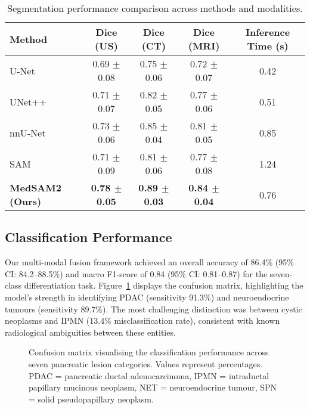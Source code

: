 \documentclass[a4paper, fleqn]{cas-dc}
\begin{document}
    \begin{table}[htbp]
        \centering
        \caption{Segmentation performance comparison across methods and
        modalities.}
        \label{tab:segmentation}
        \begin{tabular*}{\tblwidth}{@{} lcccc @{}}
            \toprule \textbf{Method} & \textbf{Dice (US)}       & \textbf{Dice (CT)}       & \textbf{Dice (MRI)}      & \textbf{Inference Time (s)} \\
            \midrule U‑Net           & 0.69 $\pm$ 0.08          & 0.75 $\pm$ 0.06          & 0.72 $\pm$ 0.07          & 0.42                        \\
            UNet++                   & 0.71 $\pm$ 0.07          & 0.82 $\pm$ 0.05          & 0.77 $\pm$ 0.06          & 0.51                        \\
            nnU‑Net                  & 0.73 $\pm$ 0.06          & 0.85 $\pm$ 0.04          & 0.81 $\pm$ 0.05          & 0.85                        \\
            SAM                      & 0.71 $\pm$ 0.09          & 0.81 $\pm$ 0.06          & 0.77 $\pm$ 0.08          & 1.24                        \\
            \textbf{MedSAM2 (Ours)}  & \textbf{0.78 $\pm$ 0.05} & \textbf{0.89 $\pm$ 0.03} & \textbf{0.84 $\pm$ 0.04} & 0.76                        \\
            \bottomrule
        \end{tabular*}
    \end{table}

    \subsection{Classification Performance}
    Our multi‐modal fusion framework achieved an overall accuracy of 86.4\% (95\%
    CI: 84.2–88.5\%) and macro F1‑score of 0.84 (95\% CI: 0.81–0.87) for the
    seven‐class differentiation task. Figure~\ref{fig:confusion} displays the confusion
    matrix, highlighting the model's strength in identifying PDAC (sensitivity 91.3\%)
    and neuroendocrine tumours (sensitivity 89.7\%). The most challenging distinction
    was between cystic neoplasms and IPMN (13.4\% misclassification rate), consistent
    with known radiological ambiguities between these entities.

    \begin{figure}[htbp]
        \centering
        \caption{Confusion matrix visualising the classification performance
        across seven pancreatic lesion categories. Values represent percentages.
        PDAC = pancreatic ductal adenocarcinoma, IPMN = intraductal papillary mucinous
        neoplasm, NET = neuroendocrine tumour, SPN = solid pseudopapillary neoplasm.}
        \label{fig:confusion}
    \end{figure}
\end{document}
